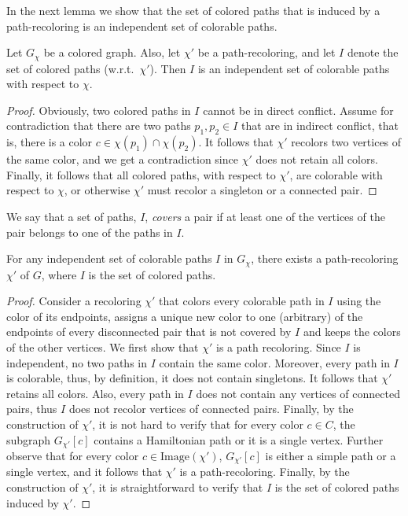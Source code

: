 In the next lemma we show that the set of colored paths that is
induced by a path-recoloring is an independent set of colorable paths.

\begin{lemma}
\label{lm:independent}
Let $G_\chi$ be a colored graph.
%
Also, 
let $\chi'$ be a path-recoloring,
and let $I$ denote the set of colored paths (w.r.t.\ $\chi'$).  
%
Then $I$ is an independent set of colorable paths with respect to $\chi$.
\end{lemma}

\begin{proof}
Obviously, 
two colored paths in $I$ cannot be in direct conflict.
%
Assume for contradiction that there are two paths $p_1, p_2 \in I$
that are in indirect conflict, 
that is, 
there is a color $c \in \chi(p_1) \cap \chi(p_2)$.
%
It follows that $\chi'$ recolors two vertices of the same color, 
and we get a contradiction since $\chi'$ does not retain all colors.
%
Finally, it follows that all colored paths, with respect to $\chi'$,
are colorable with respect to $\chi$, or otherwise $\chi'$ must
recolor a singleton or a connected pair.
\end{proof}

We say that a set of paths, $I$, \emph{covers} a pair if at least one of the
vertices of the pair belongs to one of the paths in $I$.

\begin{lemma}
\label{lm:independent_set_is_recoloring}
For any independent set of colorable paths $I$ in $G_{\chi}$, 
there exists a path-recoloring $\chi'$ of $G$, 
where $I$ is the set of colored paths.
\end{lemma}

\begin{proof}
Consider a recoloring $\chi'$ that colors every colorable path in $I$
using the color of its endpoints, assigns a unique new color 
to one (arbitrary) of the endpoints of
every disconnected pair that is not covered by $I$ 
and keeps the colors of the other vertices.
%
We first show that $\chi'$ is a path recoloring.  
%
Since $I$ is independent, 
no two paths in $I$ contain the same color.
Moreover,
every path in $I$ is colorable, 
thus, by definition, it does not contain singletons.
It follows that $\chi'$ retains all colors.  
%
Also, every path in $I$ does not contain any vertices of connected pairs, 
thus $I$ does not recolor vertices of connected pairs.
%
Finally, by the construction of $\chi'$, 
it is not hard to verify that for every color $c \in C$,
the subgraph $G_{\chi'}[c]$ contains a Hamiltonian path or it is a single vertex.
%
Further observe that for every color $c \in \text{Image}(\chi')$,
$G_{\chi'}[c]$ is either a simple path or a single vertex, and it
follows that $\chi'$ is a path-recoloring.  
%
Finally, by the
construction of $\chi'$, it is straightforward to verify that $I$ is
the set of colored paths induced by $\chi'$.
\end{proof}


